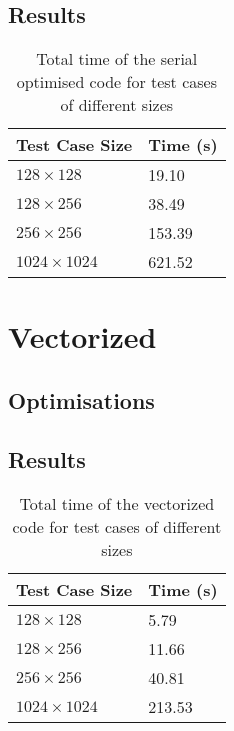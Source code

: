 \documentclass[11pt, twocolumn, a4paper]{article}
\begin{document}
\subsection{Results}

\begin{table}[htbp]
    \begin{center}
    \caption{Total time of the serial optimised code for test cases of different sizes}\label{tab:serial_optimised}
    \begin{tabular}{l | l} 
        \hline\hline
        Test Case Size&Time (s)\\
        \hline
        $128 \times 128$&19.10\\
        $128 \times 256$&38.49\\
        $256 \times 256$&153.39\\
        $1024 \times 1024$&621.52\\
        \hline
      \end{tabular}
    \end{center}
\end{table} 

\section{Vectorized}

\subsection{Optimisations}

\subsection{Results}

\begin{table}[htbp]
    \begin{center}
    \caption{Total time of the vectorized code for test cases of different sizes}\label{tab:vectorized}
    \begin{tabular}{l | l} 
        \hline\hline
        Test Case Size&Time (s)\\
        \hline
        $128 \times 128$&5.79\\
        $128 \times 256$&11.66\\
        $256 \times 256$&40.81\\
        $1024 \times 1024$&213.53\\
        \hline
      \end{tabular}
    \end{center}
\end{table} 
\end{document}
